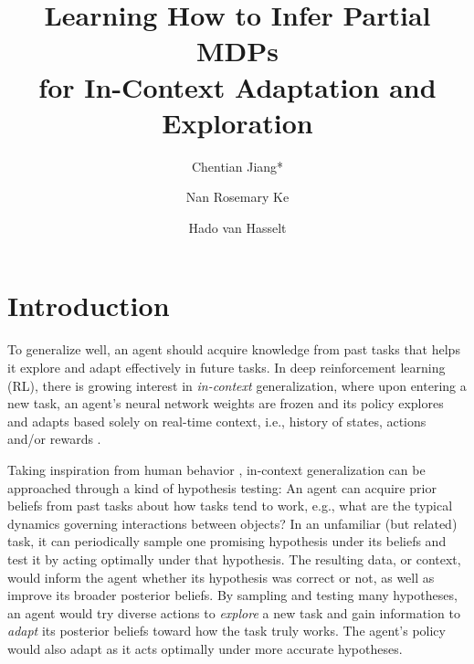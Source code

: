 \documentclass[sigconf]{aamas}
\title[Learning How to Infer Partial MDPs]{Learning How to Infer Partial MDPs \\ for In-Context Adaptation and Exploration}
\author{Chentian Jiang*}
\affiliation{
  \institution{Informatics, University of Edinburgh}
  \city{Edinburgh}
  \country{United Kingdom}}
\author{Nan Rosemary Ke}
\affiliation{
  \institution{DeepMind}
  \city{London}
  \country{United Kingdom}}
\author{Hado van Hasselt}
\affiliation{
  \institution{DeepMind}
  \city{London}
  \country{United Kingdom}}
\begin{document}
\pagestyle{fancy}
\fancyhead{}


\maketitle

\renewcommand*{\thefootnote}{\fnsymbol{footnote}}
\renewcommand*{\thefootnote}{\arabic{footnote}}

\renewcommand*{\thefootnote}{}
\renewcommand*{\thefootnote}{\arabic{footnote}}


\section{Introduction}\label{sec:intro}

To generalize well, an agent should acquire knowledge from past tasks that helps it explore and adapt effectively in future tasks. In deep reinforcement learning (RL), there is growing interest in \textit{in-context} generalization, where upon entering a new task, an agent's neural network weights are frozen and its policy explores and adapts based solely on real-time context, i.e., history of states, actions and/or rewards \citep[e.g.,][]{wangLearningReinforcementLearn2016,duanRLFastReinforcement2016,laskinIncontextReinforcementLearning2022}.

Taking inspiration from human behavior \citep[e.g.,][]{speekenbrinkUncertaintyExplorationRestless2015,schulzLearningDecisionsContextual2015}, in-context generalization can be approached through a kind of hypothesis testing: An agent can acquire prior beliefs from past tasks about how tasks tend to work, e.g., what are the typical dynamics governing interactions between objects? In an unfamiliar (but related) task, it can periodically sample one promising hypothesis under its beliefs and test it by acting optimally under that hypothesis. The resulting data, or context, would inform the agent whether its hypothesis was correct or not, as well as improve its broader posterior beliefs. By sampling and testing many hypotheses, an agent would try diverse actions to \textit{explore} a new task and gain information to \textit{adapt} its posterior beliefs toward how the task truly works. The agent's policy would also adapt as it acts optimally under more accurate hypotheses.
\end{document}
